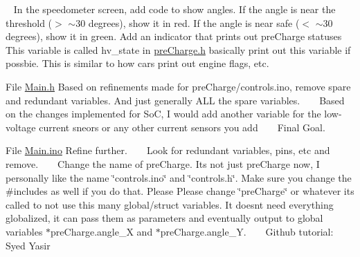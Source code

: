 \begin{DoxyRefList}
 ~\newline
 In the speedometer screen, add code to show angles. If the angle is near the threshold (\texorpdfstring{$>$}{>} $\sim$30 degrees), show it in red. If the angle is near safe (\texorpdfstring{$<$}{<} $\sim$30 degrees), show it in green. Add an indicator that prints out pre\+Charge statuses This variable is called hv\+\_\+state in \mbox{\hyperlink{_precharge_8h}{pre\+Charge.\+h}} basically print out this variable if possbie. This is similar to how cars print out engine flags, etc.  
\item[File \mbox{\hyperlink{_main_8h}{Main.h}} ]\label{todo__todo000008}%
%
 Based on refinements made for pre\+Charge/controls.\+ino, remove spare and redundant variables. And just generally ALL the spare variables. ~\newline
 ~\newline
 Based on the changes implemented for SoC, I would add another variable for the low-\/voltage current sneors or any other current sensors you add ~\newline
 ~\newline
 Final Goal.  
\item[File \mbox{\hyperlink{_main_8ino}{Main.ino}} ]\label{todo__todo000009}%
%
 Refine further. ~\newline
 ~\newline
 Look for redundant variables, pins, etc and remove. ~\newline
 ~\newline
 Change the name of pre\+Charge. It\textquotesingle{}s not just pre\+Charge now, I personally like the name \char`\"{}controls.\+ino\char`\"{} and \char`\"{}controls.\+h\char`\"{}. Make sure you change the \#includes as well if you do that. Please Please change \char`\"{}pre\+Charge\char`\"{} or whatever it\textquotesingle{}s called to not use this many global/struct variables. It doesn\textquotesingle{}t need everything globalized, it can pass them as parameters and eventually output to global variables $\ast$pre\+Charge.angle\+\_\+X and $\ast$pre\+Charge.angle\+\_\+Y. ~\newline
 ~\newline
 Github tutorial\+: ~\newline
 ~\newline
 Syed Yasir ~\newline
 ~\newline
  

\end{DoxyRefList}
